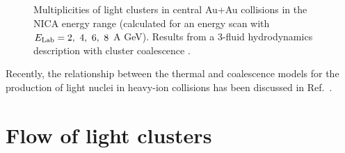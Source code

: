 \documentclass[epj]{svjour}
\begin{document}
\begin{figure}[!h]
\caption{Multiplicities of light clusters in central Au+Au collisions in the NICA energy range 
(calculated for an energy scan with $E_{\rm Lab}=2,~4,~6,~8$  A GeV). Results from a 3-fluid hydrodynamics description with cluster coalescence \cite{Russkikh:1993ct}.
\label{mult}      
}
\end{figure}

Recently, the relationship between the thermal and coalescence models for the production of light
nuclei in heavy-ion collisions has been discussed in Ref.~\cite{Mrowczynski:2016xqm}.

\section{Flow of light clusters}
\end{document}
